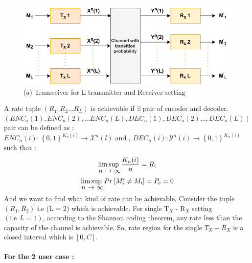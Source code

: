 \documentclass{article}
\begin{document}
 \begin{figure}[htb!]
 	\centering
 	\includegraphics[height=.20\textheight]{pic3.pdf}
 	\caption{(a) Transceiver for L-transmitter and Receiver setting } 
 	\label{fig3}
 \end{figure}
 
 
 A rate tuple $\left( R_{1}, R_{2} \dots R_{L} \right)$ is achievable if $\exists$ pair of encoder and decoder. \\
 $\left( ENC_{n}(1), ENC_{n} (2), \dots ENC_{n}(L), DEC_{n}(1), DEC_{n}(2) \dots , DEC_{n}(L)\right)$  pair can be defined as :\\
 $ENC_{n}(i) :\left\{0,1\right\}^{K_{n}(i)} \longrightarrow  \mathcal{X}^{n}(l) $ and ,
 $DEC_{n}(i) : \mathcal{Y}^{n}(i) \longrightarrow \left\{ 0,1 \right\}^{K_{n}(i)}$ such that : \\
\begin{align}
	\stackunder{$\limsup$ }{$n$ $\rightarrow$ $\infty$} \frac{K_{n}(i)}{n} = R_{i}
\end{align}
\begin{align}
	\stackunder{$\limsup$ }{$n$ $\rightarrow$ $\infty$} Pr \left[ M'_{i} \neq M_{i}\right] = P_{e} = 0 \label{2.4}
\end{align}
  And we want to find what kind of rate can be achievable. Consider the tuple $\left( R_{1}, R_{2}\right)$ i.e (L = 2) which is achievable. For single T$_{X}$ - R$_{X}$ setting $\left( \text{i.e} \hspace{5pt}  L = 1 \right)$, according to the Shannon coding theorem, any rate less than the capacity of the channel is achievable. So, rate region for the single $T_{X} - R_{X} $ is a closed interval which is $\left[ 0, C \right]$.\\  \\
  \textbf{ For the 2 user case :}
\end{document}

